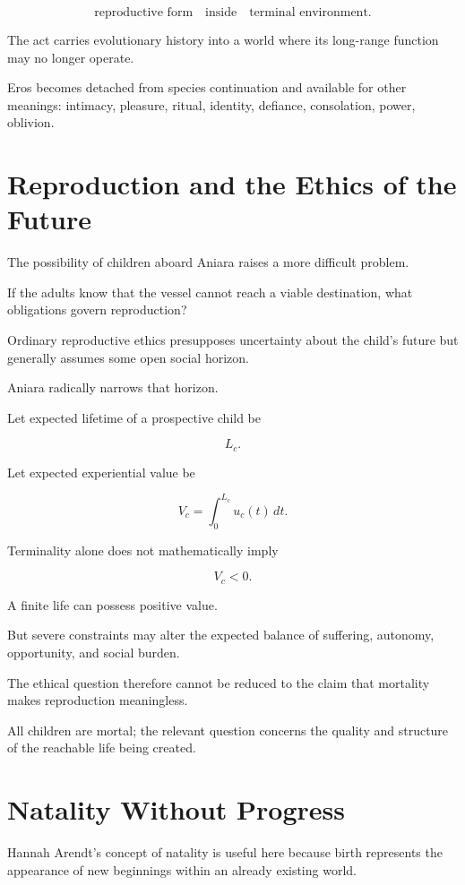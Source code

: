\documentclass[11pt,oneside]{book}
\theoremstyle{definition}
\theoremstyle{remark}
\begin{document}
\[
\text{reproductive form}
\quad\text{inside}\quad
\text{terminal environment}.
\]

The act carries evolutionary history into a world where its long-range function may no longer operate.

Eros becomes detached from species continuation and available for other meanings: intimacy, pleasure, ritual, identity, defiance, consolation, power, oblivion.

\section{Reproduction and the Ethics of the Future}

The possibility of children aboard Aniara raises a more difficult problem.

If the adults know that the vessel cannot reach a viable destination, what obligations govern reproduction?

Ordinary reproductive ethics presupposes uncertainty about the child's future but generally assumes some open social horizon.

Aniara radically narrows that horizon.

Let expected lifetime of a prospective child be

\[
L_c.
\]

Let expected experiential value be

\[
V_c
=
\int_0^{L_c}
u_c(t)\,dt.
\]

Terminality alone does not mathematically imply

\[
V_c<0.
\]

A finite life can possess positive value.

But severe constraints may alter the expected balance of suffering, autonomy, opportunity, and social burden.

The ethical question therefore cannot be reduced to the claim that mortality makes reproduction meaningless.

All children are mortal; the relevant question concerns the quality and structure of the reachable life being created.

\section{Natality Without Progress}

Hannah Arendt's concept of natality is useful here because birth represents the appearance of new beginnings within an already existing world.
\end{document}
